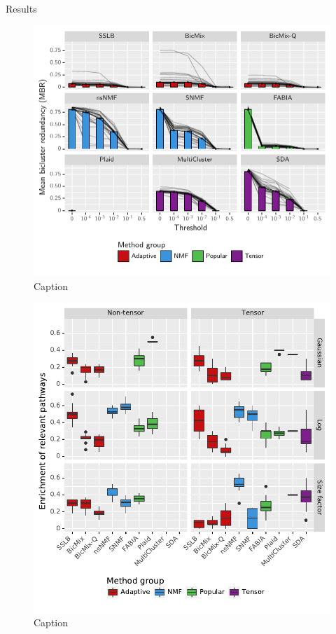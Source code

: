 \documentclass[xcolor=table,final]{beamer}
\newlength{\onecolwid}
\begin{document}
\begin{frame}[t]
\begin{columns}[t]
\begin{column}{\onecolwid}
\begin{block}{Results}
\begin{figure}
\includegraphics[width=0.9 \textwidth]{plots/threshold_adjusted_redundancy_mean_lines.pdf}
\caption{Caption}
\end{figure}

\begin{figure}
\includegraphics[width=0.9 \textwidth]{plots/compare_samegenes_K_50_datasets_ko_traits_nz_alpha_0-05.pdf}
\caption{Caption}
\end{figure}


\end{block}
\end{column}
\end{columns}
\end{frame}
\end{document}
